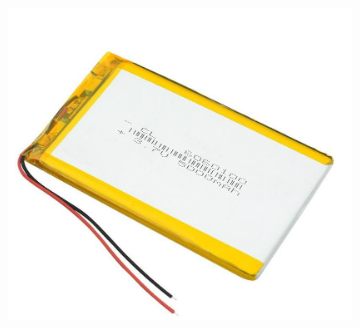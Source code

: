 \begin{figure}[!htbp]
    \centering
    \begin{subfigure}[m]{.55\linewidth}
        \centering
        \includegraphics[width=\textwidth]{assets/conception1/img142.jpg}
    \end{subfigure}
    \hfill
    \begin{subfigure}[m]{.3\linewidth}
        \centering

\end{subfigure}
\end{figure}
